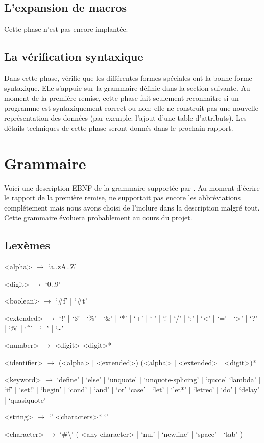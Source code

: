 \documentclass[11pt]{report}
\begin{document}
\section{L'expansion de macros}

Cette phase n'est pas encore implantée.


\section{La vérification syntaxique}

Dans cette phase, \sins{} vérifie que les différentes formes spéciales
ont la bonne forme syntaxique.  Elle s'appuie sur la grammaire définie
dans la section suivante.  Au moment de la première remise, cette
phase fait seulement reconnaître si un programme est syntaxiquement
correct ou non; elle ne construit pas une nouvelle représentation des
données (par exemple: l'ajout d'une table d'attributs).  Les détails
techniques de cette phase seront donnés dans le prochain rapport.

\appendix
\chapter{Grammaire}
\label{grammar}
Voici une description EBNF de la grammaire supportée par \sins{}. Au
moment d'écrire le rapport de la première remise, \sins{} ne
supportait pas encore les abbréviations complétement mais nous avons
choisi de l'inclure dans la description malgré tout. Cette grammaire
évoluera probablement au cours du projet.

\setlength{\grammarindent}{3em}


\section{Lexèmes}
\label{grammar-tokens}
\begin{grammar}
  <alpha> $\longrightarrow$ `a..zA..Z'

  <digit> $\longrightarrow$ `0..9'

  <boolean> $\longrightarrow$ `\#f' | `\#t'

  <extended> $\longrightarrow$ `!' | `\$' | `\%' | `\&' | `*' | `+' | `-' | `.' | `/' | `:'
  | `<' | `=' | `>' | `?' | `@' | `\textasciicircum' | `\_' | `\textasciitilde'

  <number> $\longrightarrow$ <digit> <digit>*

  <identifier> $\longrightarrow$ (<alpha> | <extended>) (<alpha> | <extended> |
  <digit>)*

  <keyword> $\longrightarrow$ `define' | `else' | `unquote' | `unquote-splicing' | `quote'
  \alt `lambda' | `if' | `set!' | `begin' | `cond' | `and' | `or'
  \alt `case' | `let' | `let*' | `letrec' | `do' | `delay' |
  `quasiquote'

  <string> $\longrightarrow$ `\textquotedbl' <characters>* `\textquotedbl'

  <character> $\longrightarrow$ `#\textbackslash' ( <any character> | `nul' |
  `newline' | `space' | `tab' )

\end{grammar}
\end{document}
